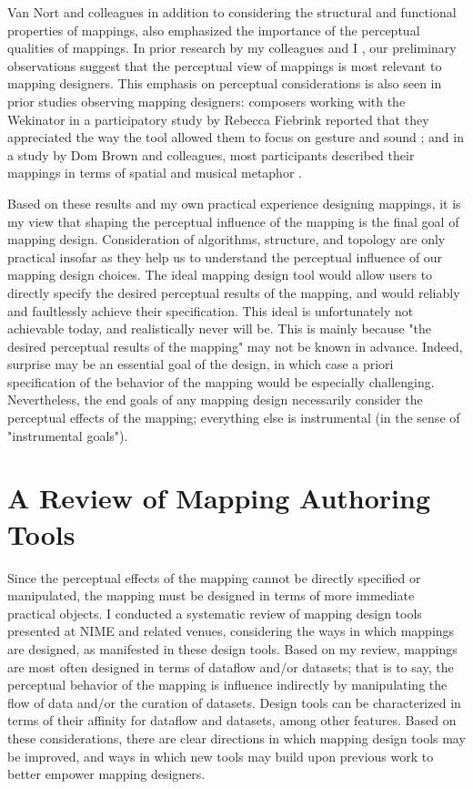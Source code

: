 \documentclass[main.tex]{subfiles}
\begin{document}
Van Nort and colleagues \cite{Nort2010, nort2014cmj} in addition to considering
the structural and functional properties of mappings, also emphasized the
importance of the perceptual qualities of mappings. In prior research by my
colleagues and I \cite{making-mappings-design-process,
making-mappings-design-criteria}, our preliminary observations suggest that the
perceptual view of mappings is most relevant to mapping designers. This
emphasis on perceptual considerations is also seen in prior studies observing
mapping designers: composers working with the Wekinator in a participatory
study by Rebecca Fiebrink reported that they appreciated the way the tool
allowed them to focus on gesture and sound \cite{Fiebrink2011}; and in a study
by Dom Brown and colleagues, most participants described their mappings in
terms of spatial and musical metaphor \cite{brown2018moco}.

Based on these results and my own practical experience designing mappings, it
is my view that shaping the perceptual influence of the mapping is the final
goal of mapping design. Consideration of algorithms, structure, and topology
are only practical insofar as they help us to understand the perceptual
influence of our mapping design choices. The ideal mapping design tool would
allow users to directly specify the desired perceptual results of the mapping,
and would reliably and faultlessly achieve their specification. This ideal is
unfortunately not achievable today, and realistically never will be. This is
mainly because "the desired perceptual results of the mapping" may not be known
in advance. Indeed, surprise may be an essential goal of the design, in which
case a priori specification of the behavior of the mapping would be especially
challenging. Nevertheless, the end goals of any mapping design necessarily
consider the perceptual effects of the mapping; everything else is instrumental
(in the sense of "instrumental goals").

\section{A Review of Mapping Authoring Tools}

Since the perceptual effects of the mapping cannot be directly specified or
manipulated, the mapping must be designed in terms of more immediate practical
objects. I conducted a systematic review of mapping design tools presented at
NIME and related venues, considering the ways in which mappings are designed,
as manifested in these design tools. Based on my review, mappings are most
often designed in terms of dataflow and/or datasets; that is to say, the
perceptual behavior of the mapping is influence indirectly by manipulating the
flow of data and/or the curation of datasets. Design tools can be characterized
in terms of their affinity for dataflow and datasets, among other features.
Based on these considerations, there are clear directions in which mapping
design tools may be improved, and ways in which new tools may build upon
previous work to better empower mapping designers.
\end{document}
